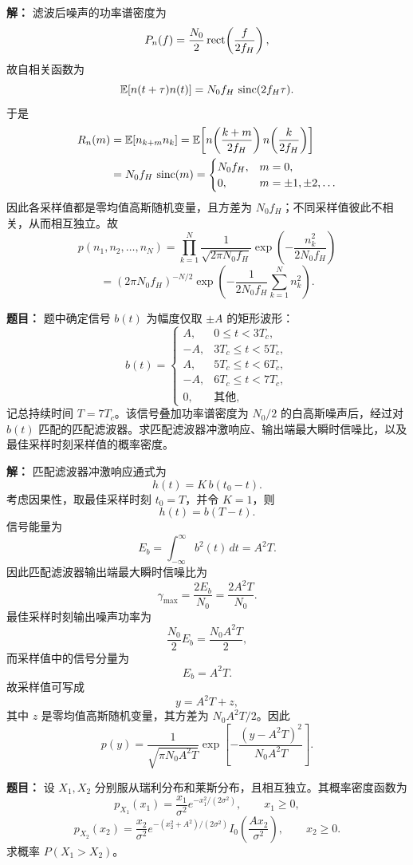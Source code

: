 \par\textbf{解：}
滤波后噪声的功率谱密度为
\[
P_n(f)=\frac{N_0}{2}\operatorname{rect}\!\left(\frac{f}{2f_H}\right),
\]
故自相关函数为
\[
\mathbb{E}[n(t+\tau)n(t)]=N_0f_H\,\operatorname{sinc}(2f_H\tau).
\]
于是
\begin{align*}
R_n(m)
&=\mathbb{E}[n_{k+m}n_k]
=\mathbb{E}\!\left[n\!\left(\frac{k+m}{2f_H}\right)n\!\left(\frac{k}{2f_H}\right)\right] \\
&=N_0f_H\,\operatorname{sinc}(m)
=
\begin{cases}
N_0f_H,& m=0,\\
0,& m=\pm1,\pm2,\dots
\end{cases}
\end{align*}
因此各采样值都是零均值高斯随机变量，且方差为 $N_0f_H$；不同采样值彼此不相关，从而相互独立。故
\[
p(n_1,n_2,\dots,n_N)
=\prod_{k=1}^N\frac{1}{\sqrt{2\pi N_0f_H}}
\exp\!\left(-\frac{n_k^2}{2N_0f_H}\right)
\]
\[
=(2\pi N_0f_H)^{-N/2}\exp\!\left(-\frac{1}{2N_0f_H}\sum_{k=1}^N n_k^2\right).
\]

\medskip
{}
\textbf{题目：}
题中确定信号 $b(t)$ 为幅度仅取 $\pm A$ 的矩形波形：
\[
b(t)=
\begin{cases}
A,& 0\le t<3T_c,\\
-A,& 3T_c\le t<5T_c,\\
A,& 5T_c\le t<6T_c,\\
-A,& 6T_c\le t<7T_c,\\
0,& \text{其他},
\end{cases}
\]
记总持续时间 $T=7T_c$。该信号叠加功率谱密度为 $N_0/2$ 的白高斯噪声后，经过对 $b(t)$ 匹配的匹配滤波器。求匹配滤波器冲激响应、输出端最大瞬时信噪比，以及最佳采样时刻采样值的概率密度。

\par\textbf{解：}
匹配滤波器冲激响应通式为
\[
h(t)=K\,b(t_0-t).
\]
考虑因果性，取最佳采样时刻 $t_0=T$，并令 $K=1$，则
\[
h(t)=b(T-t).
\]
信号能量为
\[
E_b=\int_{-\infty}^{\infty}b^2(t)\,dt=A^2T.
\]
因此匹配滤波器输出端最大瞬时信噪比为
\[
\gamma_{\max}=\frac{2E_b}{N_0}=\frac{2A^2T}{N_0}.
\]
最佳采样时刻输出噪声功率为
\[
\frac{N_0}{2}E_b=\frac{N_0A^2T}{2},
\]
而采样值中的信号分量为
\[
E_b=A^2T.
\]
故采样值可写成
\[
y=A^2T+z,
\]
其中 $z$ 是零均值高斯随机变量，其方差为 $N_0A^2T/2$。因此
\[
p(y)=\frac{1}{\sqrt{\pi N_0A^2T}}
\exp\!\left[-\frac{(y-A^2T)^2}{N_0A^2T}\right].
\]

\medskip
{}
\textbf{题目：}
设 $X_1,X_2$ 分别服从瑞利分布和莱斯分布，且相互独立。其概率密度函数为
\[
p_{X_1}(x_1)=\frac{x_1}{\sigma^2}e^{-x_1^2/(2\sigma^2)},\qquad x_1\ge 0,
\]
\[
p_{X_2}(x_2)=\frac{x_2}{\sigma^2}e^{-(x_2^2+A^2)/(2\sigma^2)}I_0\!\left(\frac{Ax_2}{\sigma^2}\right),\qquad x_2\ge 0.
\]
求概率 $P(X_1>X_2)$。

